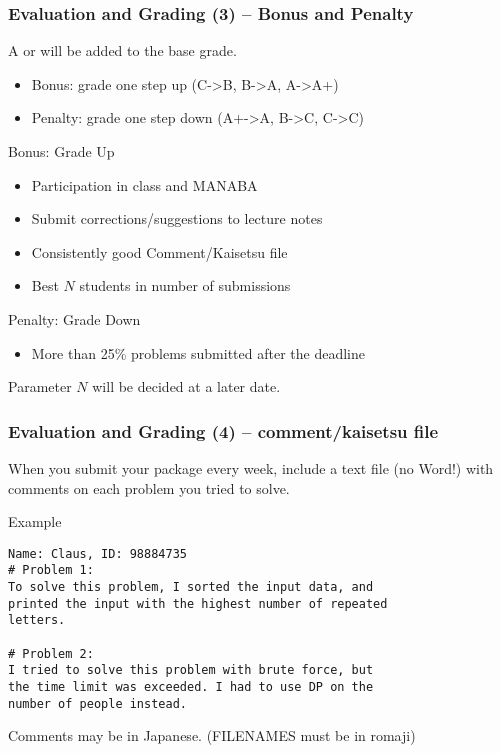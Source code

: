 \documentclass{beamer}
\begin{document}
\begin{frame}
  \frametitle{Evaluation and Grading (3) -- Bonus and Penalty}
  
  {\small
  A  or  will be added to the base grade.
  \begin{itemize}
    \item Bonus: grade one step up (C->B, B->A, A->A+)
    \item Penalty: grade one step down (A+->A, B->C, \alert{C->C})
  \end{itemize}
  }

  \medskip
  \begin{exampleblock}{Bonus: Grade Up}
    \begin{itemize}
    \item Participation in class and MANABA
    \item Submit corrections/suggestions to lecture notes
    \item Consistently good Comment/Kaisetsu file
    \item Best $N$ students in number of submissions
    \end{itemize}
  \end{exampleblock}
  \begin{alertblock}{Penalty: Grade Down}
    \begin{itemize}
    \item More than 25\% problems submitted after the deadline
    \end{itemize}
  \end{alertblock}

  \tiny{Parameter $N$ will be decided at a later date.}
\end{frame}

\begin{frame}[fragile]
  \frametitle{Evaluation and Grading (4) -- comment/kaisetsu file}

  When you submit your package every week, include a text file (no
  Word!) with comments on each problem you tried to solve.
    
  \begin{exampleblock}{Example}
    {\smaller
\begin{verbatim}
Name: Claus, ID: 98884735
# Problem 1:
To solve this problem, I sorted the input data, and 
printed the input with the highest number of repeated 
letters.

# Problem 2: 
I tried to solve this problem with brute force, but 
the time limit was exceeded. I had to use DP on the 
number of people instead.
\end{verbatim}}
  \end{exampleblock}

  \bigskip
  
  Comments may be in Japanese. {\small (FILENAMES must be in romaji)}
\end{frame}
\end{document}
